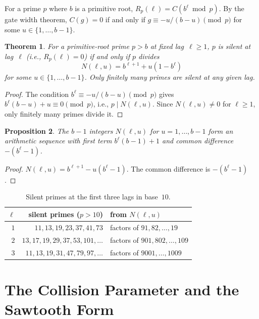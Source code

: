 \documentclass[12pt]{amsart}
\newtheorem{theorem}{Theorem}
\newtheorem{proposition}[theorem]{Proposition}
\theoremstyle{definition}
\theoremstyle{remark}
\begin{document}
For a prime $p$ where $b$ is a primitive root, $R_p(\ell) =
C(b^{\ell} \bmod p)$. By the gate width theorem, $C(g) = 0$ if
and only if $g \equiv -u/(b{-}u) \pmod{p}$ for some
$u \in \{1, \ldots, b{-}1\}$.

\begin{theorem}\label{thm:silent}
For a primitive-root prime $p > b$ at fixed lag~$\ell \ge 1$,
$p$ is silent at lag~$\ell$ (i.e., $R_p(\ell) = 0$) if and
only if $p$ divides
\[
N(\ell, u) = b^{\ell+1} + u(1 - b^{\ell})
\]
for some $u \in \{1, \ldots, b{-}1\}$. Only finitely many
primes are silent at any given lag.
\end{theorem}

\begin{proof}
The condition $b^{\ell} \equiv -u/(b{-}u) \pmod{p}$ gives
$b^{\ell}(b{-}u) + u \equiv 0 \pmod{p}$, i.e.,
$p \mid N(\ell, u)$. Since $N(\ell, u) \ne 0$ for $\ell \ge 1$,
only finitely many primes divide it.
\end{proof}

\begin{proposition}\label{prop:arithmetic}
The $b - 1$ integers $N(\ell, u)$ for $u = 1, \ldots, b{-}1$
form an arithmetic sequence with first term
$b^{\ell}(b{-}1) + 1$ and common difference $-(b^{\ell} - 1)$.
\end{proposition}

\begin{proof}
$N(\ell, u) = b^{\ell+1} - u(b^{\ell} - 1)$. The common
difference is $-(b^{\ell} - 1)$.
\end{proof}

\begin{table}[h]
\centering
\begin{tabular}{rrl}
\toprule
$\ell$ & silent primes ($p > 10$) & from $N(\ell, u)$ \\
\midrule
$1$ & $11, 13, 19, 23, 37, 41, 73$ & factors of
  $91, 82, \ldots, 19$ \\
$2$ & $13, 17, 19, 29, 37, 53, 101, \ldots$ & factors of
  $901, 802, \ldots, 109$ \\
$3$ & $11, 13, 19, 31, 47, 79, 97, \ldots$ & factors of
  $9001, \ldots, 1009$ \\
\bottomrule
\end{tabular}
\caption{Silent primes at the first three lags in base~$10$.}
\label{tab:silent}
\end{table}

\section{The Collision Parameter and the Sawtooth Form}
\end{document}
